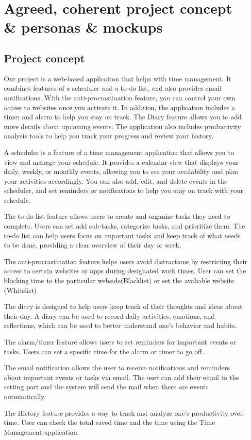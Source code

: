 \documentclass[a4paper]{article}
\begin{document}
\newpage

\section{Agreed, coherent project concept \& personas \& mockups}

\subsection{Project concept}

Our project is a web-based application that helps with time management. It combines features of a scheduler and a to-do list, and also provides email notifications. With the anti-procrastination feature, you can control your own access to websites once you activate it. In addition, the application includes a timer and alarm to help you stay on track. The Diary feature allows you to add more details about upcoming events. The application also includes productivity analysis tools to help you track your progress and review your history.
\par
A scheduler is a feature of a time management application that allows you to view and manage your schedule. It provides a calendar view that displays your daily, weekly, or monthly events, allowing you to see your availability and plan your activities accordingly. You can also add, edit, and delete events in the scheduler, and set reminders or notifications to help you stay on track with your schedule.
\par
The to-do list feature allows users to create and organize tasks they need to complete. Users can set add sub-tasks, categorize tasks, and prioritize them. The to-do list can help users focus on important tasks and keep track of what needs to be done, providing a clear overview of their day or week.
\par
The anti-procrastination feature helps users avoid distractions by restricting their access to certain websites or apps during designated work times. User can set the blocking time to the particular webside(Blacklist) or set the avaliable website (Whitelist)
\par
The diary is designed to help users keep track of their thoughts and ideas about their day.  A diary can be used to record daily activities, emotions, and reflections, which can be used to better understand one's behavior and habits.
\par
The alarm/timer feature allows users to set reminders for important events or tasks. Users can set a specific time for the alarm or timer to go off.
\par
The email notification allows the user to receive notifications and reminders about important events or tasks via email. The user can add their email to the setting part and the system will send the mail when there are events automatically.
\par
The History feature provides a way to track and analyze one's productivity over time. User can check the total saved time and the time using the Time Management application.
\end{document}
